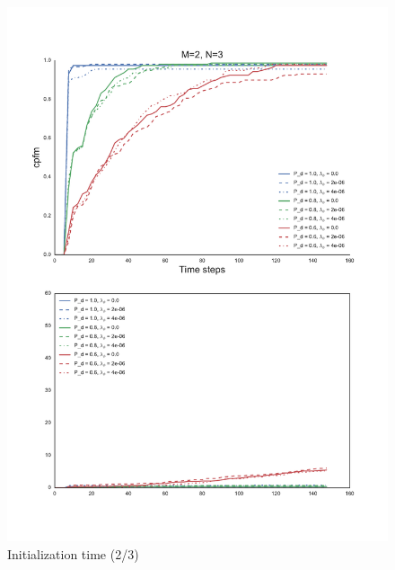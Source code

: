 {\begin{figure}
\centering
\includegraphics[height = .9\textheight]{Figures/plots/Scenario1_Init-Time(2-3).pdf}
\caption{Initialization time (2/3)}\label{fig:init_time_2-3}
\end{figure}

}

